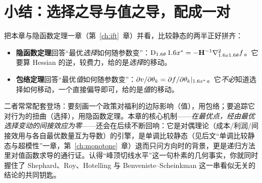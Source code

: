 

\section{小结：选择之导与值之导，配成一对}
\label{sec:envelope-summary}

把本章与隐函数定理一章（第~\ref{ch:ift}~章）并看，比较静态的两半正好拼齐：

\begin{itemize}
    \item \textbf{隐函数定理}回答``最优\emph{选择}如何随参数变''：$\operatorname{D}_{1.6\theta}1.6 x^*=-\mathbf{H}^{-1}\nabla^2_{1.6 x1.6\theta}f$。它要算 Hessian 的逆，较费力，给的是\emph{选择}的移动。
    \item \textbf{包络定理}回答``最优\emph{值}如何随参数变''：$\partial v/\partial\theta_k=\partial f/\partial\theta_k|_{1.6 x^*}$。它\emph{不必}知道选择如何移动，一个直接偏导即可，给的是\emph{值}的移动。
\end{itemize}

二者常常配套登场：要刻画一个政策对福利的边际影响（值），用包络；要追踪它对行为的扭曲（选择），用隐函数定理。本章的核心机制——\emph{在最优点，经由最优选择变动的间接效应为零}——还会在后续不断回响：它是对偶理论（成本/利润/间接效用与各自最优数量互为导数）的引擎，是单调比较静态（见后文``单调比较静态与超模性''一章，第~\ref{ch:monotone}~章）退而只问方向时的背景，更是递归方法里对值函数求导的通行证。认得``峰顶切线水平''这一句朴素的几何事实，你就同时握住了 Shephard、Roy、Hotelling 与 Benveniste--Scheinkman 这一串看似无关的结论的共同钥匙。
